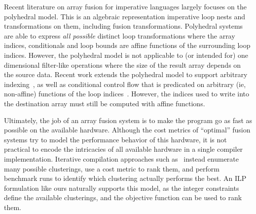 Recent literature on array fusion for imperative languages largely focuses on the polyhedral model. This is an algebraic representation imperative loop nests and transformations on them, including fusion transformations. Polyhedral systems \cite{pouchet2011polyhedral} are able to express \emph{all possible} distinct loop transformations where the array indices, conditionals and loop bounds are affine functions of the surrounding loop indices. However, the polyhedral model is not applicable to (or intended for) one dimensional filter-like operations where the size of the result array depends on the source data. Recent work extends the polyhedral model to support arbitrary indexing~\cite{venkat2014polyhedral}, as well as conditional control flow that is predicated on arbitrary (ie, non-affine) functions of the loop indices~\cite{benabderrahmane2010polyhedral}. However, the indices used to write into the destination array must still be computed with affine functions. 

Ultimately, the job of an array fusion system is to make the program go as fast as possible on the available hardware. Although the cost metrics of ``optimal'' fusion systems try to model the performance behavior of this hardware, it is not practical to encode the intricacies of all available hardware in a single compiler implementation. Iterative compilation approaches such as~\cite{ashby2006iterative} instead enumerate many possible clusterings, use a cost metric to rank them, and perform benchmark runs to identify which clustering actually performs the best. An ILP formulation like ours naturally supports this model, as the integer constraints define the available clusterings, and the objective function can be used to rank them.



% 
% 

